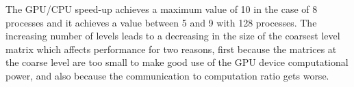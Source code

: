 The GPU/CPU speed-up achieves a maximum value of 10 in the case of 8
processes and it achieves a value between  5 and 9  with 128
processes. The  increasing number of levels leads to a decreasing in
the size of the coarsest level matrix which affects performance for
two reasons, first because the matrices at the coarse level are too
small to make good use of the GPU device computational power, and also
because the communication to computation ratio gets worse.




